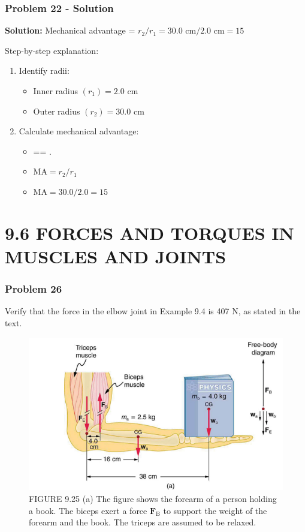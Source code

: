 \documentclass{beamer}
\begin{document}
\begin{frame}
\frametitle{Problem 22 - Solution}
\textbf{Solution:}
Mechanical advantage = $r_2/r_1 = 30.0 \text{ cm}/2.0 \text{ cm} = 15$

Step-by-step explanation:
\begin{enumerate}
    \item Identify radii:
    \begin{itemize}
        \item Inner radius $(r_1) = 2.0 \text{ cm}$
        \item Outer radius $(r_2) = 30.0 \text{ cm}$
    \end{itemize}
    \item Calculate mechanical advantage:
    \begin{itemize}
      \item {}== .
        \item $\text{MA} = r_2/r_1$
        \item $\text{MA} = 30.0/2.0 = 15$
    \end{itemize}
\end{enumerate}
\end{frame}

\section{9.6 FORCES AND TORQUES IN MUSCLES AND JOINTS}

\begin{frame}
\frametitle{Problem 26}
Verify that the force in the elbow joint in Example 9.4 is 407 N, as stated in the text.
\begin{figure}
    \centering
    \includegraphics[width=0.7\linewidth]{CH9/Screenshot 2024-11-04 122655.png}
    \caption{FIGURE 9.25 (a) The figure shows the forearm of a person holding a book. The biceps exert a force $\mathbf{F}_{\mathrm{B}}$ to support the weight of the forearm and the book. The triceps are assumed to be relaxed.}
\end{figure}
\end{frame}
\end{document}
